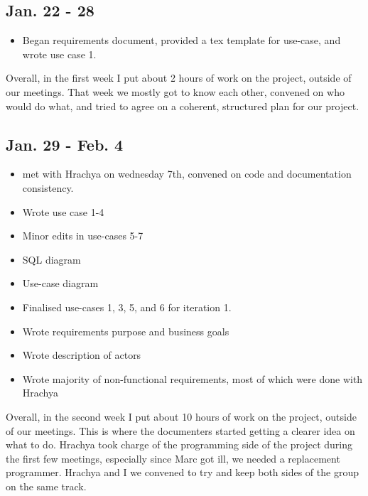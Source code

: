 \documentclass[12pt]{article}
\begin{document}
\maketitle

\subsection*{Jan. 22 - 28}

\begin{itemize}
    \item Began requirements document, provided a tex template for use-case, and wrote use case 1.
\end{itemize}

Overall, in the first week I put about 2 hours of  work on the project, outside of our meetings. That week we mostly got to know each other, convened on who would do what, and tried to agree on a coherent, structured plan for our project.

\subsection*{Jan. 29 - Feb. 4}

\begin{itemize}
    \item met with Hrachya on wednesday 7th, convened on code and documentation consistency.
    \item Wrote use case 1-4
    \item Minor edits in use-cases 5-7
    \item SQL diagram
    \item Use-case diagram
    \item Finalised use-cases 1, 3, 5, and 6 for iteration 1.
    \item Wrote requirements purpose and business goals
    \item Wrote description of actors
    \item Wrote majority of non-functional requirements, most of which were done with Hrachya
\end{itemize}

Overall,  in the second week I put about 10 hours of work on the project, outside of our meetings. This is where the documenters started getting a clearer idea on what to do. Hrachya took charge of the programming side of the project during the first few meetings, especially since Marc got ill, we needed a replacement programmer. Hrachya and I we convened to try and keep both sides of the group on the same track. 
\end{document}

